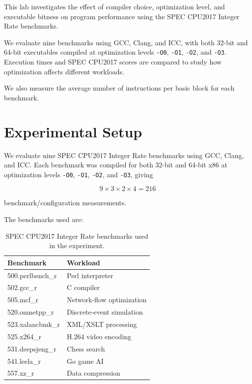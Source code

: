 \documentclass[11pt,a4paper]{article}
\begin{document}
This lab investigates the effect of compiler choice, optimization level, and executable bitness on program performance using the SPEC CPU2017 Integer Rate benchmarks.

We evaluate nine benchmarks using GCC, Clang, and ICC, with both 32-bit and 64-bit executables compiled at optimization levels \texttt{-O0}, \texttt{-O1}, \texttt{-O2}, and \texttt{-O3}. Execution times and SPEC CPU2017 scores are compared to study how optimization affects different workloads.

We also measure the average number of instructions per basic block for each benchmark.


\section{Experimental Setup}

We evaluate nine SPEC CPU2017 Integer Rate benchmarks using GCC, Clang, and ICC. Each benchmark was compiled for both 32-bit and 64-bit x86 at optimization levels \texttt{-O0}, \texttt{-O1}, \texttt{-O2}, and \texttt{-O3}, giving

$$
9 \times 3 \times 2 \times 4 = 216
$$

benchmark/configuration measurements.

The benchmarks used are:

\begin{table}[H]
    \centering
    \caption{SPEC CPU2017 Integer Rate benchmarks used in the experiment.}
    \label{tab:benchmarks}
    \begin{tabularx}{\textwidth}{
        >{\ttfamily\raggedright\arraybackslash}p{}
        X
    }
        \toprule
        Benchmark & Workload \\
        \midrule
        500.perlbench\_r  & Perl interpreter \\
        502.gcc\_r        & C compiler \\
        505.mcf\_r        & Network-flow optimization \\
        520.omnetpp\_r    & Discrete-event simulation \\
        523.xalancbmk\_r  & XML/XSLT processing \\
        525.x264\_r       & H.264 video encoding \\
        531.deepsjeng\_r  & Chess search \\
        541.leela\_r      & Go game AI \\
        557.xz\_r         & Data compression \\
        \bottomrule
    \end{tabularx}
\end{table}
\end{document}
